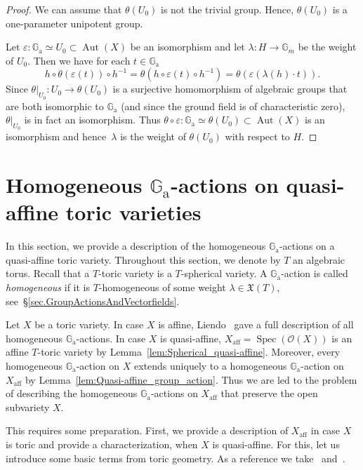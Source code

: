 \documentclass[JEP,XML,SOM,Unicode]{cedram}
\let\mathcal\mathscr
\newcommand{\ra}{\mathrm{a}}
\theoremstyle{plain}
\theoremstyle{definition}
\DeclareMathOperator{\Aut}{Aut}
\DeclareMathOperator{\Spec}{Spec}
\DeclareMathOperator{\aff}{aff}
\newcommand{\OO}{\mathcal{O}}
\newcommand{\GG}{\mathbb{G}}
\begin{document}
\begin{proof}
We can assume that $\theta(U_0)$ is not the trivial group.
Hence, $\theta(U_0)$ is a one-parameter unipotent group.

Let $\varepsilon \colon \GG_\ra \simeq U_0 \subset \Aut(X)$
be an isomorphism and let
$\lambda \colon H \to \GG_m$ be the weight of $U_0$. Then we have for each $t \in \GG_\ra$
\[
h \circ \theta(\varepsilon(t)) \circ h^{-1} =
\theta(h \circ \varepsilon(t) \circ h^{-1}) = \theta(\varepsilon(\lambda(h)\cdot t)).
\]
Since $\theta |_{U_0} \colon U_0 \to \theta(U_0)$ is a surjective
homomorphism of algebraic groups that are both isomorphic to $\GG_\ra$ (and since the ground field is of
characteristic zero), $\theta |_{U_0}$ is in fact an isomorphism.
Thus $\theta \circ \varepsilon \colon \GG_\ra \simeq \theta(U_0) \subset \Aut(X)$ is an isomorphism
and hence~$\lambda$ is the weight of $\theta(U_0)$ with respect to $H$.
\end{proof}

\section{Homogeneous \texorpdfstring{$\GG_\ra$}{Ga}-actions on quasi-affine toric varieties}
\label{sec.homogeneou_Ga-actions_quasi-affine}

In this section, we provide a description of the homogeneous $\GG_\ra$-actions
on a quasi-affine toric variety. Throughout this section, we denote by $T$ an algebraic torus.
Recall that a $T$-toric variety is a $T$-spherical variety.
A $\GG_\ra$-action is called
\emph{homogeneous} if it is $T$-homogeneous
of some weight $\lambda \in \mathfrak{X}(T)$, see~\S\ref{sec.GroupActionsAndVectorfields}.

Let $X$ be a toric variety. In case $X$ is affine, Liendo~\cite{Li2010Affine-Bbb-T-varie}
gave a full description
of all homogeneous $\GG_\ra$-actions. In case $X$ is quasi-affine, $X_{\aff} = \Spec(\OO(X))$ is an affine
$T$-toric variety by Lemma~\ref{lem:Spherical_quasi-affine}.
Moreover, every homogeneous $\GG_\ra$-action
on $X$ extends uniquely to a homogeneous $\GG_\ra$-action on $X_{\aff}$ by Lemma~\ref{lem:Quasi-affine_group_action}.
Thus we are led to the problem of describing the homogeneous $\GG_\ra$-actions on $X_{\aff}$ that preserve
the open subvariety $X$.

This requires some preparation.
First, we provide a description of $X_{\aff}$ in case $X$ is toric and
provide a characterization, when $X$ is quasi-affine. For this, let us introduce some basic terms
from toric geometry. As a reference we take~\cite{Fu1993Introduction-to-to} and~\cite{CoLiSc2011Toric-varieties}.
\end{document}
